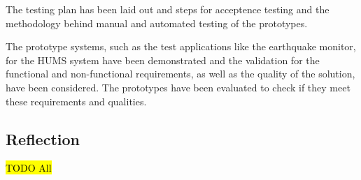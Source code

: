 \documentclass[10pt,a4paper]{article}
\begin{document}
The testing plan has been laid out and steps for acceptence testing and the methodology behind manual and automated testing of the prototypes.

The prototype systems, such as the test applications like the earthquake monitor, for the HUMS system have been demonstrated and the validation for the functional and non-functional requirements, as well as the quality of the solution, have been considered. The prototypes have been evaluated to check if they meet these requirements and qualities.


\subsection{Reflection}
\label{sec:reflection}
\hl{TODO All}



\end{document}
